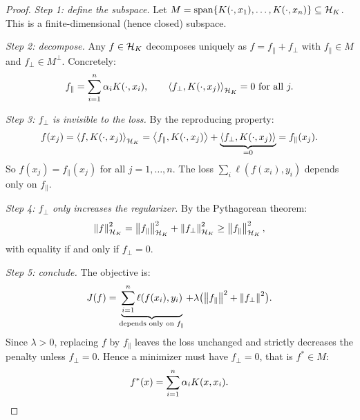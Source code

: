 \begin{notechapter}
\begin{proof}
\emph{Step 1: define the subspace.} Let $M = \operatorname{span}\{K(\cdot, x_1),
\ldots, K(\cdot, x_n)\} \subseteq \mathcal{H}_K$. This is a finite-dimensional
(hence closed) subspace.

\emph{Step 2: decompose.} Any $f \in \mathcal{H}_K$ decomposes uniquely as $f =
f_\parallel + f_\perp$ with $f_\parallel \in M$ and $f_\perp \in
M^\perp$. Concretely:
\[
f_\parallel = \sum_{i=1}^n \alpha_i K(\cdot, x_i), \qquad
\left\langle f_\perp, K(\cdot, x_j) \right\rangle_{\mathcal{H}_K} = 0 \text{ for all } j.
\]

\emph{Step 3: $f_\perp$ is invisible to the loss.} By the reproducing
property:
\[
f(x_j) = \left\langle f, K(\cdot, x_j) \right\rangle_{\mathcal{H}_K} = \left\langle f_\parallel, K(\cdot,
x_j) \right\rangle + \underbrace{\left\langle f_\perp, K(\cdot, x_j) \right\rangle}_{= 0} =
f_\parallel(x_j).
\]
So $f(x_j) = f_\parallel(x_j)$ for all $j = 1, \ldots, n$. The loss
$\sum_i \ell(f(x_i), y_i)$ depends only on $f_\parallel$.

\emph{Step 4: $f_\perp$ only increases the regularizer.} By the
Pythagorean theorem:
\[
\left\|f\right\|_{\mathcal{H}_K}^2 = \left\|f_\parallel\right\|_{\mathcal{H}_K}^2 + \left\|f_\perp\right\|_{\mathcal{H}_K}^2
\geq \left\|f_\parallel\right\|_{\mathcal{H}_K}^2,
\]
with equality if and only if $f_\perp = 0$.

\emph{Step 5: conclude.} The objective is:
\[
J(f) = \underbrace{\sum_{i=1}^n \ell(f(x_i), y_i)}_{\text{depends only
on } f_\parallel} + \lambda\bigl(\left\|f_\parallel\right\|^2 +
\left\|f_\perp\right\|^2\bigr).
\]
Since $\lambda > 0$, replacing $f$ by $f_\parallel$ leaves the loss unchanged and strictly decreases the penalty unless $f_\perp = 0$. Hence a minimizer must have $f_\perp = 0$, that is $f^* \in M$:
\[
f^*(x) = \sum_{i=1}^n \alpha_i K(x, x_i). \qedhere
\]
\end{proof}

\begin{figure}[ht]
\centering
{}
\end{figure}
\end{notechapter}
